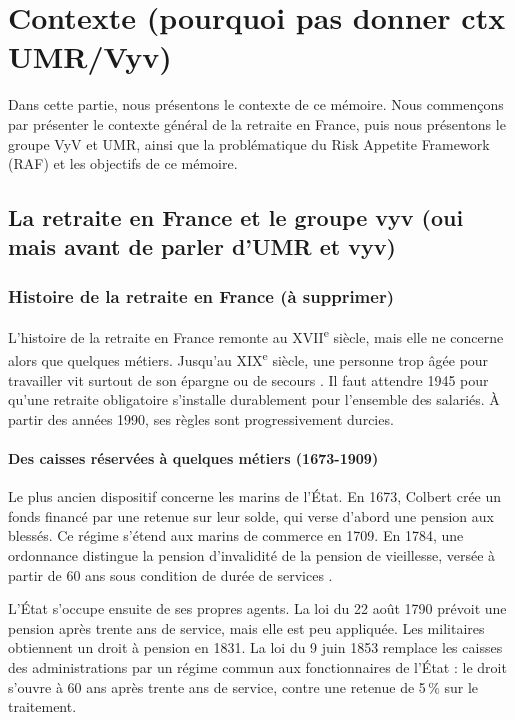 \chapter{Contexte (pourquoi pas donner ctx UMR/Vyv)}
\label{chap:contexte}

Dans cette partie, nous présentons le contexte de ce mémoire.
Nous commençons par présenter le contexte général de la retraite en France, puis nous présentons le groupe VyV et UMR, ainsi que la problématique du Risk Appetite Framework (RAF) et les objectifs de ce mémoire.

\section{La retraite en France et le groupe vyv (oui mais avant de parler d'UMR et vyv)}
\label{sec:retraite_france}

\subsection{Histoire de la retraite en France (à supprimer)}
\label{subsec:histoire_retraite}

L'histoire de la retraite en France remonte au XVII\textsuperscript{e} siècle, mais elle ne concerne alors que quelques métiers. Jusqu'au XIX\textsuperscript{e} siècle, une personne trop âgée pour travailler vit surtout de son épargne ou de secours \cite{cor2022}. Il faut attendre 1945 pour qu'une retraite obligatoire s'installe durablement pour l'ensemble des salariés. À partir des années 1990, ses règles sont progressivement durcies.

\subsubsection{Des caisses réservées à quelques métiers (1673-1909)}

Le plus ancien dispositif concerne les marins de l'État. En 1673, Colbert crée un fonds financé par une retenue sur leur solde, qui verse d'abord une pension aux blessés. Ce régime s'étend aux marins de commerce en 1709. En 1784, une ordonnance distingue la pension d'invalidité de la pension de vieillesse, versée à partir de 60 ans sous condition de durée de services \cite{cor2022}.

L'État s'occupe ensuite de ses propres agents. La loi du 22 août 1790 prévoit une pension après trente ans de service, mais elle est peu appliquée. Les militaires obtiennent un droit à pension en 1831. La loi du 9 juin 1853 remplace les caisses des administrations par un régime commun aux fonctionnaires de l'État : le droit s'ouvre à 60 ans après trente ans de service, contre une retenue de 5\,\% sur le traitement.

